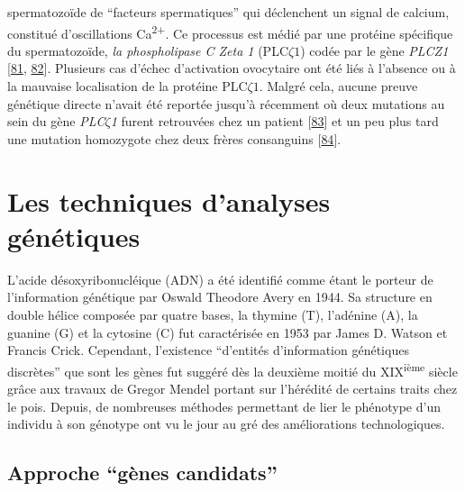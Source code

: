 \documentclass[12pt,twoside]{reedthesis}
\theoremstyle{definition}
\theoremstyle{definition}
\theoremstyle{remark}
\begin{document}
\begin{enumerate}
    spermatozoïde de ``facteurs spermatiques'' qui déclenchent un signal
    de calcium, constitué d'oscillations Ca\textsuperscript{2+}. Ce
    processus est médié par une protéine spécifique du spermatozoïde,
    \emph{la phospholipase C Zeta 1} (PLC\(\zeta 1\)) codée par le gène
    \emph{PLCZ1} {[}\protect\hyperlink{ref-Nomikos2013}{81},
    \protect\hyperlink{ref-Amdani2013}{82}{]}. Plusieurs cas d'échec
    d'activation ovocytaire ont été liés à l'absence ou à la mauvaise
    localisation de la protéine PLC\(\zeta1\). Malgré cela, aucune preuve
    génétique directe n'avait été reportée jusqu'à récemment où deux
    mutations au sein du gène \emph{PLC}\(\zeta\)\emph{1} furent
    retrouvées chez un patient
    {[}\protect\hyperlink{ref-Heytens2009}{83}{]} et un peu plus tard une
    mutation homozygote chez deux frères consanguins
    {[}\protect\hyperlink{ref-Escoffier2016}{84}{]}.
  \end{enumerate}
  
  \newpage  
  
  \section{Les techniques d'analyses
  génétiques}\label{les-techniques-danalyses-genetiques}
  
  L'acide désoxyribonucléique (ADN) a été identifié comme étant le porteur
  de l'information génétique par Oswald Theodore Avery en 1944. Sa
  structure en double hélice composée par quatre bases, la thymine (T),
  l'adénine (A), la guanine (G) et la cytosine (C) fut caractérisée en
  1953 par James D. Watson et Francis Crick. Cependant, l'existence
  ``d'entités d'information génétiques discrètes'' que sont les gènes fut
  suggéré dès la deuxième moitié du XIX\textsuperscript{ième} siècle grâce
  aux travaux de Gregor Mendel portant sur l'hérédité de certains traits
  chez le pois. Depuis, de nombreuses méthodes permettant de lier le
  phénotype d'un individu à son génotype ont vu le jour au gré des
  améliorations technologiques.
  
  \subsection{\texorpdfstring{Approche ``gènes
  candidats''}{Approche gènes candidats}}\label{approche-genes-candidats}
  
\end{document}

